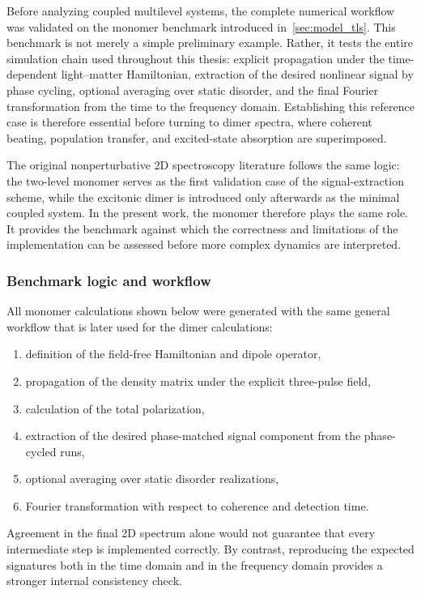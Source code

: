 Before analyzing coupled multilevel systems, the complete numerical workflow was
validated on the monomer benchmark introduced in~\autoref{sec:model_tls}.
This benchmark is not merely a simple preliminary example.
Rather, it tests the entire simulation chain used throughout this thesis:
explicit propagation under the time-dependent light--matter Hamiltonian,
extraction of the desired nonlinear signal by phase cycling, optional averaging
over static disorder, and the final Fourier transformation from the time to the
frequency domain.
Establishing this reference case is therefore essential before turning to dimer
spectra, where coherent beating, population transfer, and excited-state
absorption are superimposed.

The original nonperturbative 2D spectroscopy literature follows the same logic:
the two-level monomer serves as the first validation case of the
signal-extraction scheme, while the excitonic dimer is introduced only
afterwards as the minimal coupled system.
In the present work, the monomer therefore plays the same role.
It provides the benchmark against which the correctness and limitations of the
implementation can be assessed before more complex dynamics are interpreted.

\subsubsection{Benchmark logic and workflow}

All monomer calculations shown below were generated with the same general
workflow that is later used for the dimer calculations:
\begin{enumerate}
    \item definition of the field-free Hamiltonian and dipole operator,
    \item propagation of the density matrix under the explicit three-pulse field,
    \item calculation of the total polarization,
    \item extraction of the desired phase-matched signal component from the
    phase-cycled runs,
    \item optional averaging over static disorder realizations,
    \item Fourier transformation with respect to coherence and detection time.
\end{enumerate}

Agreement in the final 2D spectrum alone would not guarantee that every
intermediate step is implemented correctly.
By contrast, reproducing the expected signatures both in the time domain and in
the frequency domain provides a stronger internal consistency check.

